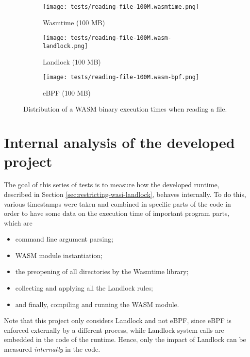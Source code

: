 \begin{figure}[ht!]
  \begin{subfigure}[b]{0.32\textwidth}
    \centering
    \texttt{[image: tests/reading-file-100M.wasmtime.png]}
    \caption{Wasmtime (100 MB)}
  \end{subfigure}
  \begin{subfigure}[b]{0.32\textwidth}
    \centering
    \texttt{[image: tests/reading-file-100M.wasm-landlock.png]}
    \caption{Landlock (100 MB)}
  \end{subfigure}
  \begin{subfigure}[b]{0.32\textwidth}
    \centering
    \texttt{[image: tests/reading-file-100M.wasm-bpf.png]}
    \caption{eBPF (100 MB)}
  \end{subfigure}

  \caption{Distribution of a WASM binary execution times when reading a file.}
  \label{fig:distribution-reading-wasm}
\end{figure}

\clearpage
\section{Internal analysis of the developed project}
\label{sec:performance-internal-analysis}

The goal of this series of tests is to measure how the developed runtime,
described in Section \ref{sec:restricting-wasi-landlock}, behaves internally.
To do this, various timestamps were taken and combined in specific parts of the
code in order to have some data on the execution time of important program parts,
which are
\begin{itemize}
  \item command line argument parsing;
  \item WASM module instantiation;
  \item the preopening of all directories by the Wasmtime library;
  \item collecting and applying all the Landlock rules;
  \item and finally, compiling and running the WASM module.
\end{itemize}

Note that this project only considers Landlock and not eBPF, since eBPF is enforced externally
by a different process, while Landlock system calls are embedded in the code of the runtime.
Hence, only the impact of Landlock can be measured \textit{internally} in the code.

\vspace*{0.5cm}

